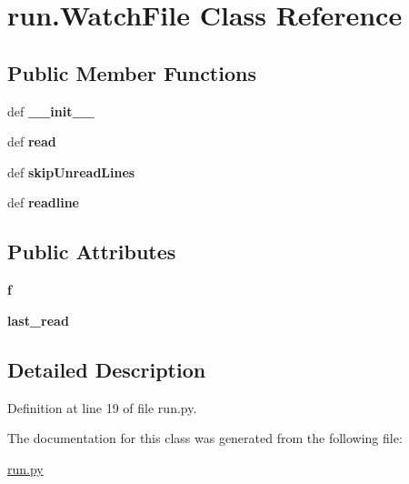 \hypertarget{classrun_1_1_watch_file}{
\section{run.WatchFile Class Reference}
\label{classrun_1_1_watch_file}
}
\subsection*{Public Member Functions}
\begin{DoxyCompactItemize}
\item 
\hypertarget{classrun_1_1_watch_file_a0a33ec665757d1237fb0a616b27c3d88}{
def {\bfseries \_\-\_\-init\_\-\_\-}}
\label{classrun_1_1_watch_file_a0a33ec665757d1237fb0a616b27c3d88}

\item 
\hypertarget{classrun_1_1_watch_file_adbe75c1f0d71f3fa33d9bc9d99533021}{
def {\bfseries read}}
\label{classrun_1_1_watch_file_adbe75c1f0d71f3fa33d9bc9d99533021}

\item 
\hypertarget{classrun_1_1_watch_file_ac78d1f471640d0dd6cec71fa3794af07}{
def {\bfseries skipUnreadLines}}
\label{classrun_1_1_watch_file_ac78d1f471640d0dd6cec71fa3794af07}

\item 
\hypertarget{classrun_1_1_watch_file_abcff3cf052a255e755ca3ce009a59049}{
def {\bfseries readline}}
\label{classrun_1_1_watch_file_abcff3cf052a255e755ca3ce009a59049}

\end{DoxyCompactItemize}
\subsection*{Public Attributes}
\begin{DoxyCompactItemize}
\item 
\hypertarget{classrun_1_1_watch_file_aec0f2ff6f53a437f40e6d4d49cb2ab93}{
{\bfseries f}}
\label{classrun_1_1_watch_file_aec0f2ff6f53a437f40e6d4d49cb2ab93}

\item 
\hypertarget{classrun_1_1_watch_file_ab3431a0c63d34f51d1660fcfdab53411}{
{\bfseries last\_\-read}}
\label{classrun_1_1_watch_file_ab3431a0c63d34f51d1660fcfdab53411}

\end{DoxyCompactItemize}


\subsection{Detailed Description}


Definition at line 19 of file run.py.



The documentation for this class was generated from the following file:\begin{DoxyCompactItemize}
\item 
\hyperlink{run_8py}{run.py}\end{DoxyCompactItemize}
